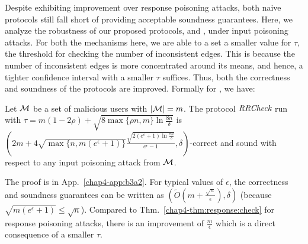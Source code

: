 

Despite exhibiting improvement over response poisoning attacks, both naive protocols still fall short of providing acceptable soundness guarantees. Here, we analyze the robustness of our proposed protocols, \DegRRNaive{} and \DegHybrid{}, under input poisoning attacks. For both the mechanisms here, we are able to a set a smaller value for $\tau$, the threshold for checking the number of inconsistent edges. This is because the number of inconsistent edges is more concentrated around its means, and hence, a tighter confidence interval with a smaller $\tau$ suffices. Thus, both the correctness and soundness of the protocols are improved. Formally for \DegRRNaive{}, we have:

\begin{thm}\label{chap4-thm:input:check}
Let $\mathcal{M}$ be a set of malicious users with $|\mathcal{M}| = m$. 
The protocol $\textit{RRCheck}$ run with $\tau = m(1-2\rho) + \sqrt{8 \max\{\rho n, m\} \ln \frac{8n}{\delta}}$ is 
  $(2m+4\sqrt{\max\{n, m(e^\epsilon+1)\}}\frac{\sqrt{2(e^\epsilon+1) \ln \frac{8n}{\delta}}}{e^\epsilon-1}, \delta)$-correct and sound with respect to any input poisoning attack from $\mathcal{M}$.
\end{thm}
The proof is in App.~\ref{chap4-app:b3a2}.
For typical values of $\epsilon$, the correctness and soundness guarantees can be written as $(\tilde{O}(m + \frac{\sqrt{n}}{\epsilon}), \delta)$ (because $\sqrt{m(e^\epsilon+1)} \leq \sqrt{n}$). Compared to Thm.~\ref{chap4-thm:response:check} for response poisoning attacks, there is an improvement of $\frac{m}{\epsilon}$ which is a direct consequence of a smaller $\tau$. 

